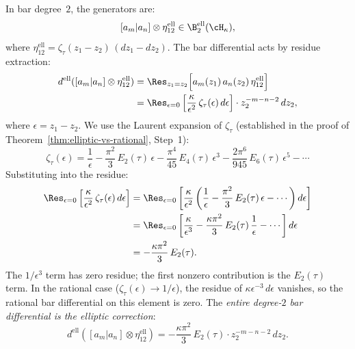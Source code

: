 \begin{computation}
\label{comp:ell-bar-deg2}
In bar degree~$2$, the generators are:
\[
[a_m | a_n] \otimes \eta_{12}^{\mathrm{ell}}
\in \B^{\mathrm{ell}}_2(\cH_\kappa),
\]
where $\eta_{12}^{\mathrm{ell}} = \zeta_\tau(z_1 - z_2)\,(dz_1 - dz_2)$.
The bar differential acts by residue extraction:
\begin{align}\label{eq:ell-bar-diff-deg2}
d^{\mathrm{ell}}([a_m | a_n] \otimes \eta_{12}^{\mathrm{ell}})
&= \Res_{z_1 = z_2}\Bigl[
a_m(z_1)\,a_n(z_2)\,\eta_{12}^{\mathrm{ell}}
\Bigr] \notag \\
&= \Res_{\epsilon = 0}\left[
\frac{\kappa}{\epsilon^2}\,
\zeta_\tau(\epsilon)\,d\epsilon
\right] \cdot z_2^{-m-n-2}\,dz_2,
\end{align}
where $\epsilon = z_1 - z_2$. We use the Laurent expansion of
$\zeta_\tau$ (established in the proof of
Theorem~\ref{thm:elliptic-vs-rational}, Step~1):
\begin{equation}\label{eq:zeta-laurent}
\zeta_\tau(\epsilon)
= \frac{1}{\epsilon}
- \frac{\pi^2}{3}\,E_2(\tau)\,\epsilon
- \frac{\pi^4}{45}\,E_4(\tau)\,\epsilon^3
- \frac{2\pi^6}{945}\,E_6(\tau)\,\epsilon^5
- \cdots
\end{equation}
Substituting into the residue:
\begin{align}\label{eq:ell-residue-expansion}
\Res_{\epsilon = 0}\left[
\frac{\kappa}{\epsilon^2}\,
\zeta_\tau(\epsilon)\,d\epsilon
\right]
&= \Res_{\epsilon = 0}\left[
\frac{\kappa}{\epsilon^2}\left(
\frac{1}{\epsilon}
- \frac{\pi^2}{3}\,E_2(\tau)\,\epsilon
- \cdots
\right) d\epsilon
\right] \notag \\
&= \Res_{\epsilon = 0}\left[
\frac{\kappa}{\epsilon^3}
- \frac{\kappa\pi^2}{3}\,E_2(\tau)\,\frac{1}{\epsilon}
- \cdots
\right] d\epsilon \notag \\
&= -\frac{\kappa\pi^2}{3}\,E_2(\tau).
\end{align}
The $1/\epsilon^3$ term has zero residue; the first nonzero
contribution is the $E_2(\tau)$ term. In the rational case
($\zeta_\tau(\epsilon) \to 1/\epsilon$), the residue of
$\kappa\epsilon^{-3}\,d\epsilon$ vanishes, so the rational
bar differential on this element is zero. The
\emph{entire degree-$2$ bar differential is the elliptic
correction}:
\begin{equation}\label{eq:ell-bar-diff-result}
d^{\mathrm{ell}}([a_m | a_n] \otimes \eta_{12}^{\mathrm{ell}})
= -\frac{\kappa\pi^2}{3}\,E_2(\tau)
\cdot z_2^{-m-n-2}\,dz_2.
\end{equation}
\end{computation}

